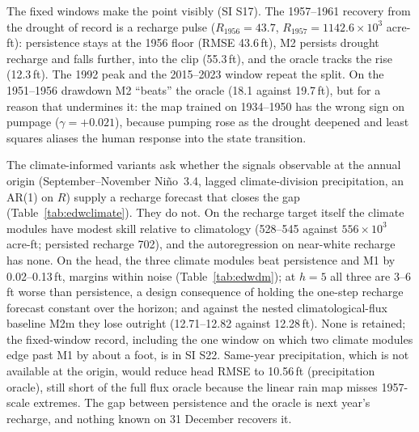 \documentclass[preprint,11pt,authoryear]{elsarticle}
\theoremstyle{definition}
\theoremstyle{remark}
\begin{document}
The fixed windows make the point visibly (SI S17). The 1957--1961 recovery from the drought of record is a recharge pulse ($R_{1956}=43.7$, $R_{1957}=1142.6\times10^3$ acre-ft): persistence stays at the 1956 floor (RMSE 43.6\,ft), M2 persists drought recharge and falls further, into the clip (55.3\,ft), and the oracle tracks the rise (12.3\,ft). The 1992 peak and the 2015--2023 window repeat the split. On the 1951--1956 drawdown M2 ``beats'' the oracle (18.1 against 19.7\,ft), but for a reason that undermines it: the map trained on 1934--1950 has the wrong sign on pumpage ($\gamma=+0.021$), because pumping rose as the drought deepened and least squares aliases the human response into the state transition.

The climate-informed variants ask whether the signals observable at the annual origin (September--November Ni\~no~3.4, lagged climate-division precipitation, an AR(1) on $R$) supply a recharge forecast that closes the gap (Table~\ref{tab:edwclimate}). They do not. On the recharge target itself the climate modules have modest skill relative to climatology (528--545 against $556\times10^3$ acre-ft; persisted recharge 702), and the autoregression on near-white recharge has none. On the head, the three climate modules beat persistence and M1 by 0.02--0.13\,ft, margins within noise (Table~\ref{tab:edwdm}); at $h=5$ all three are 3--6\,ft worse than persistence, a design consequence of holding the one-step recharge forecast constant over the horizon; and against the nested climatological-flux baseline M2m they lose outright (12.71--12.82 against 12.28\,ft). None is retained; the fixed-window record, including the one window on which two climate modules edge past M1 by about a foot, is in SI S22. Same-year precipitation, which is not available at the origin, would reduce head RMSE to 10.56\,ft (precipitation oracle), still short of the full flux oracle because the linear rain map misses 1957-scale extremes. The gap between persistence and the oracle is next year's recharge, and nothing known on 31 December recovers it.
\end{document}
